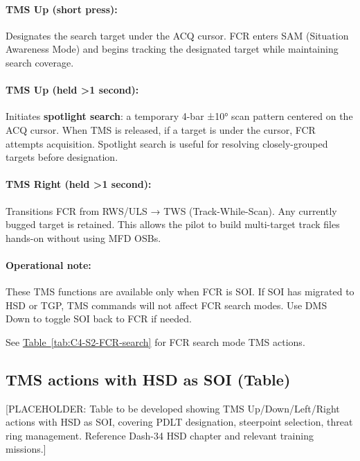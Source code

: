 \documentclass[11pt, a4paper, twoside]{report}
\newcommand{\tabref}[1]{\hyperref[#1]{Table~\ref*{#1}}}
\begin{document}
\paragraph{TMS Up (short press):}
Designates the search target under the ACQ cursor. FCR enters SAM (Situation Awareness Mode) and begins tracking the designated target while maintaining search coverage.

\paragraph{TMS Up (held >1 second):}
Initiates \textbf{spotlight search}: a temporary 4-bar ±10° scan pattern centered on the ACQ cursor. When TMS is released, if a target is under the cursor, FCR attempts acquisition. Spotlight search is useful for resolving closely-grouped targets before designation.

\paragraph{TMS Right (held >1 second):}
Transitions FCR from RWS/ULS → TWS (Track-While-Scan). Any currently bugged target is retained. This allows the pilot to build multi-target track files hands-on without using MFD OSBs.

\paragraph{Operational note:}
These TMS functions are available only when FCR is SOI. If SOI has migrated to HSD or TGP, TMS commands will not affect FCR search modes. Use DMS Down to toggle SOI back to FCR if needed.

See \tabref{tab:C4-S2-FCR-search} for FCR search mode TMS actions.

\subsection{TMS actions with HSD as SOI (Table)}
\label{sec:C4-S2-S3}

[PLACEHOLDER: Table to be developed showing TMS Up/Down/Left/Right actions with HSD as SOI, covering PDLT designation, steerpoint selection, threat ring management. Reference Dash-34 HSD chapter and relevant training missions.]
\end{document}

